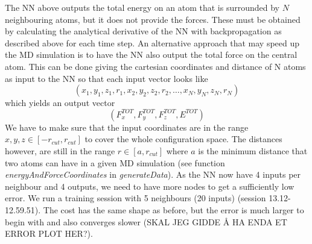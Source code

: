 \documentclass[twoside,english]{uiofysmaster}
\begin{document}
The NN above outputs the total energy on an atom that is surrounded by $N$ neighbouring atoms, but it does not provide the forces. 
These must be obtained by calculating the analytical derivative of the NN with backpropagation as described above for each time step.
An alternative approach that may speed up the MD simulation is to have the NN also output the total force on the central atom. 
This can be done giving the cartesian coordinates and distance of N atoms as input to the NN so that each input
vector looks like
\begin{equation}
 (x_1, y_1, z_1, r_1, x_2, y_2, z_2, r_2, \dots, x_N, y_N, z_N, r_N)
\end{equation}
which yields an output vector
\begin{equation}
 (F_x^{TOT}, F_y^{TOT}, F_z^{TOT}, E^{TOT})
\end{equation}
We have to make sure that the input coordinates are in the range 
$x, y, z \in [-r_{cut}, r_{cut}]$ to cover the whole configuration space. The distances however, are still in the range
$r \in [a, r_{cut}]$ where $a$ is the minimum distance that two atoms can have in a given MD simulation (see function
\textit{energyAndForceCoordinates} in \textit{generateData}). As the NN now have 4 inputs per neighbour and 4 outputs, 
we need to have more nodes to get a sufficiently low error. We run a training session with 5 neighbours (20 inputs) 
(session 13.12-12.59.51). The cost has the same shape as before, but the error is much larger to begin with and also converges
slower (SKAL JEG GIDDE Å HA ENDA ET ERROR PLOT HER?).
\end{document}
